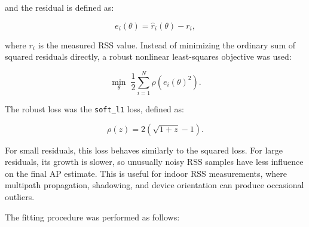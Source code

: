\documentclass[11pt,a4paper]{article}
\begin{document}
and the residual is defined as:

\begin{equation}
e_i(\theta)=\widehat{r}_i(\theta)-r_i,
\end{equation}

where \(r_i\) is the measured RSS value. Instead of minimizing the ordinary
sum of squared residuals directly, a robust nonlinear least-squares objective
was used:

\begin{equation}
\min_{\theta}\; \frac{1}{2}\sum_{i=1}^{N}\rho\left(e_i(\theta)^2\right).
\end{equation}

The robust loss was the \texttt{soft\_l1} loss, defined as:

\begin{equation}
\rho(z)=2\left(\sqrt{1+z}-1\right).
\end{equation}

For small residuals, this loss behaves similarly to the squared loss. For large
residuals, its growth is slower, so unusually noisy RSS samples have less
influence on the final AP estimate. This is useful for indoor RSS measurements,
where multipath propagation, shadowing, and device orientation can produce
occasional outliers.

The fitting procedure was performed as follows:
\end{document}
